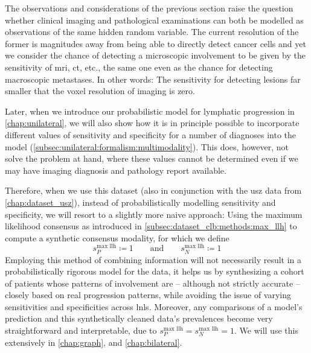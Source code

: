 \documentclass[\relativeRoot/main.tex]{subfiles}
\begin{document}
The observations and considerations of the previous section raise the question whether clinical imaging and pathological examinations can both be modelled as observations of the same hidden random variable. The current resolution of the former is magnitudes away from being able to directly detect cancer cells and yet we consider the chance of detecting a microscopic involvement to be given by the sensitivity of \gls{mri}, \gls{ct}, etc., the same one even as the chance for detecting macroscopic metastases. In other words: The sensitivity for detecting lesions far smaller that the voxel resolution of imaging is zero.

Later, when we introduce our probabilistic model for lymphatic progression in \cref{chap:unilateral}, we will also show how it is in principle possible to incorporate different values of sensitivity and specificity for a number of diagnoses into the model (\cref{subsec:unilateral:formalism:multimodality}). This does, however, not solve the problem at hand, where these values cannot be determined even if we may have imaging diagnosis and pathology report available.

Therefore, when we use this dataset (also in conjunction with the \gls{usz} data from \cref{chap:dataset_usz}), instead of probabilistically modelling sensitivity and specificity, we will resort to a slightly more naive approach: Using the maximum likelihood consensus as introduced in \cref{subsec:dataset_clb:methods:max_llh} to compute a synthetic consensus modality, for which we define
%
\begin{equation}
    s_P^\text{max llh} \coloneqq 1 \qquad \text{and} \qquad s_N^\text{max llh} \coloneqq 1
\end{equation}
%
Employing this method of combining information will not necessarily result in a probabilistically rigorous model for the data, it helps us by synthesizing a cohort of patients whose patterns of involvement are -- although not strictly accurate -- closely based on real progression patterns, while avoiding the issue of varying sensitivities and specificities across \glspl{lnl}. Moreover, any comparisons of a model's prediction and this synthetically cleaned data's prevalences become very straightforward and interpretable, due to $s_P^\text{max llh} = s_N^\text{max llh} = 1$. We will use this extensively in \cref{chap:graph}, and \cref{chap:bilateral}.
\end{document}
